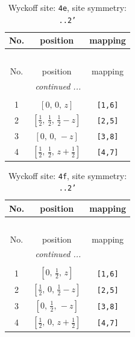 \documentclass[fleqn,8pt]{jsarticle}
\begin{document}
\begin{longtable}{ccc}
\caption{Wyckoff site: {\tt 4e}, site symmetry: {\tt ..2'}}
 \\
 \hline \hline
No. & position & mapping \\ \hline \endfirsthead

\multicolumn{2}{l}{\tablename\ \thetable{}} \\
 \hline \hline
No. & position & mapping \\ \hline \endhead

 \hline \hline
\multicolumn{2}{r}{\footnotesize\it continued ...} \\ \endfoot

 \hline \hline
\multicolumn{2}{r}{} \\ \endlastfoot

1 & $\left[ 0,\, 0,\, z \right]$ & {\tt [1,6]} \\ \hline
2 & $\left[ \frac{1}{2},\, \frac{1}{2},\, \frac{1}{2} - z \right]$ & {\tt [2,5]} \\ \hline
3 & $\left[ 0,\, 0,\, - z \right]$ & {\tt [3,8]} \\ \hline
4 & $\left[ \frac{1}{2},\, \frac{1}{2},\, z + \frac{1}{2} \right]$ & {\tt [4,7]} \\
\end{longtable}
\renewcommand{\arraystretch}{1.2}
\begin{longtable}{ccc}
\caption{Wyckoff site: {\tt 4f}, site symmetry: {\tt ..2'}}
 \\
 \hline \hline
No. & position & mapping \\ \hline \endfirsthead

\multicolumn{2}{l}{\tablename\ \thetable{}} \\
 \hline \hline
No. & position & mapping \\ \hline \endhead

 \hline \hline
\multicolumn{2}{r}{\footnotesize\it continued ...} \\ \endfoot

 \hline \hline
\multicolumn{2}{r}{} \\ \endlastfoot

1 & $\left[ 0,\, \frac{1}{2},\, z \right]$ & {\tt [1,6]} \\ \hline
2 & $\left[ \frac{1}{2},\, 0,\, \frac{1}{2} - z \right]$ & {\tt [2,5]} \\ \hline
3 & $\left[ 0,\, \frac{1}{2},\, - z \right]$ & {\tt [3,8]} \\ \hline
4 & $\left[ \frac{1}{2},\, 0,\, z + \frac{1}{2} \right]$ & {\tt [4,7]} \\
\end{longtable}
\end{document}
